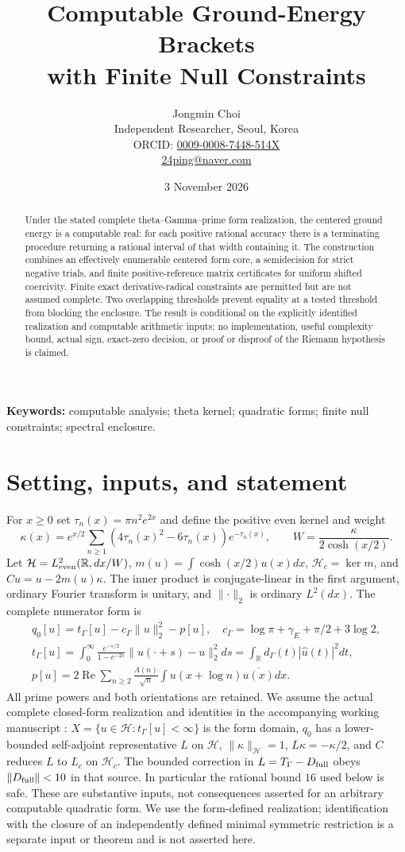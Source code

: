 \documentclass[11pt]{article}
\title{Computable Ground-Energy Brackets\\with Finite Null Constraints}
\author{Jongmin Choi\\\small Independent Researcher, Seoul, Korea\\\small ORCID: \href{https://orcid.org/0009-0008-7448-514X}{0009-0008-7448-514X}\\\small \href{mailto:24ping@naver.com}{24ping@naver.com}}
\date{3 November 2026}
\newcommand{\R}{\mathbb R}\newcommand{\C}{\mathbb C}\newcommand{\Hh}{\mathcal H}\newcommand{\Nn}{\mathcal N}\newcommand{\norm}[1]{\lVert#1\rVert}\newcommand{\ip}[2]{\langle #1,#2\rangle}\newcommand{\dom}{\operatorname{Dom}}
\begin{document}
\maketitle
\begin{abstract}
Under the stated complete theta--Gamma--prime form realization, the centered ground energy is a computable real: for each positive rational accuracy there is a terminating procedure returning a rational interval of that width containing it. The construction combines an effectively enumerable centered form core, a semidecision for strict negative trials, and finite positive-reference matrix certificates for uniform shifted coercivity. Finite exact derivative-radical constraints are permitted but are not assumed complete. Two overlapping thresholds prevent equality at a tested threshold from blocking the enclosure. The result is conditional on the explicitly identified realization and computable arithmetic inputs; no implementation, useful complexity bound, actual sign, exact-zero decision, or proof or disproof of the Riemann hypothesis is claimed.
\end{abstract}
\noindent\textbf{Keywords:} computable analysis; theta kernel; quadratic forms; finite null constraints; spectral enclosure.

\section{Setting, inputs, and statement}\label{setting}
For $x\ge0$ set $\tau_n(x)=\pi n^2e^{2x}$ and define the positive even kernel and weight
\[\kappa(x)=e^{x/2}\sum_{n\ge1}(4\tau_n(x)^2-6\tau_n(x))e^{-\tau_n(x)},\qquad W=\frac{\kappa}{2\cosh(x/2)}.\]
Let $\Hh=L^2_{\rm even}(\R,dx/W)$, $m(u)=\int\cosh(x/2)u(x)dx$, $\Hh_c=\ker m$, and $Cu=u-2m(u)\kappa$. The inner product is conjugate-linear in the first argument, ordinary Fourier transform is unitary, and $\norm{\cdot}_2$ is ordinary $L^2(dx)$. The complete numerator form is
\begin{gather*}
 q_0[u]=t_\Gamma[u]-c_\Gamma\norm u_2^2-p[u],\quad c_\Gamma=\log\pi+\gamma_E+\pi/2+3\log2,\\
 t_\Gamma[u]=\int_0^\infty\frac{e^{-s/2}}{1-e^{-2s}}\norm{u(\cdot+s)-u}_2^2ds
 =\int_{\R}d_\Gamma(t)|\widehat u(t)|^2dt,\\
 p[u]=2\operatorname{Re}\sum_{n\ge2}\frac{\Lambda(n)}{\sqrt n}\int u(x+\log n)\overline{u(x)}dx.
\end{gather*}
All prime powers and both orientations are retained. We assume the actual complete closed-form realization and identities in the accompanying working manuscript \cite{source}: $X=\{u\in\Hh:t_\Gamma[u]<\infty\}$ is the form domain, $q_0$ has a lower-bounded self-adjoint representative $L$ on $\Hh$, $\norm\kappa_{\Hh}=1$, $L\kappa=-\kappa/2$, and $C$ reduces $L$ to $L_c$ on $\Hh_c$. The bounded correction in $L=T_\Gamma-D_{\rm full}$ obeys $\norm{D_{\rm full}}<10$ in that source. In particular the rational bound $16$ used below is safe. These are substantive inputs, not consequences asserted for an arbitrary computable quadratic form. We use the form-defined realization; identification with the closure of an independently defined minimal symmetric restriction is a separate input or theorem and is not asserted here.
\end{document}

